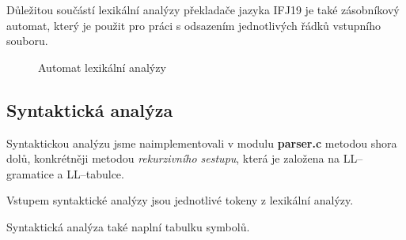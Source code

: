 \documentclass[12pt]{article}
\begin{document}
Důležitou součástí lexikální analýzy překladače jazyka IFJ19 je také zásobníkový automat, který je použit pro práci s odsazením jednotlivých řádků vstupního souboru.
\begin{figure}[!htbp]
    \centering
    \caption{Automat lexikální analýzy}
    \label{obr:1}
\end{figure}
\clearpage
\subsection{Syntaktická analýza}
Syntaktickou analýzu jsme naimplementovali v modulu \textbf{parser.c} metodou shora dolů, konkrétněji metodou \textit{rekurzivního sestupu}, která je založena na LL--gramatice a LL--tabulce.

Vstupem syntaktické analýzy jsou jednotlivé tokeny z lexikální analýzy.

Syntaktická analýza také naplní tabulku symbolů.
\end{document}
